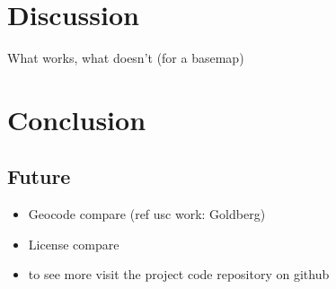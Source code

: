 \documentclass[12pt,letterpaper]{article}
\begin{document}


\section{Discussion}
What works, what doesn't (for a basemap)


\section{Conclusion}
\subsection{Future}
\begin{itemize}
	\item Geocode compare (ref usc work: Goldberg)
	\item License compare
	\item to see more visit the project code repository on github
\end{itemize}

\printbibliography[heading=bibliography]
\end{document}
